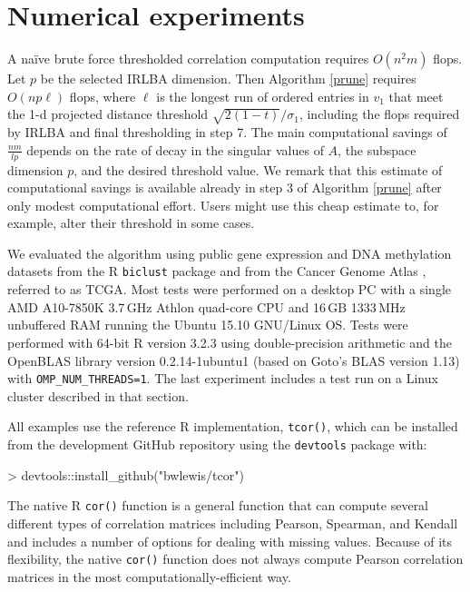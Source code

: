 \documentclass{article}
\let\proglang=\textsf
\numberwithin{algorithmctr}{section}
\begin{document}
\section{Numerical experiments}\label{examples}

A na\"ive brute force thresholded correlation computation requires $O(n^2 m)$ flops.
Let $p$ be the selected IRLBA dimension. Then Algorithm \ref{prune} requires
$O(n p \ell)$ flops, where $\ell$ is the longest run of ordered entries in
$v_1$ that meet the 1-d projected distance threshold $\sqrt{2(1-t)}/\sigma_1$,
including the flops required by IRLBA and final thresholding in step 7.  The
main computational savings of $\frac{nm}{lp}$ depends on the rate of decay in
the singular values of $A$, the subspace dimension $p$, and the desired
threshold value. We remark that this estimate of computational savings is
available already in step 3 of Algorithm \ref{prune} after only modest
computational effort. Users might use this cheap estimate to, for example,
alter their threshold in some cases.

We evaluated the algorithm using public gene expression and DNA methylation
datasets from the \proglang{R} {\tt biclust} \cite{biclust} package and from
the Cancer Genome Atlas \cite{gdac}, referred to as TCGA.  Most tests were
performed on a desktop PC with a single AMD A10-7850K 3.7$\,$GHz Athlon
quad-core CPU and 16$\,$GB 1333$\,$MHz unbuffered RAM running the Ubuntu 15.10
GNU/Linux OS. Tests were performed with 64-bit \proglang{R} version 3.2.3 using
double-precision arithmetic and the OpenBLAS library version 0.2.14-1ubuntu1
(based on Goto's BLAS version 1.13) with {\tt OMP\_NUM\_THREADS=1}. The last
experiment includes a test run on a Linux cluster described in that section.

All examples use the reference \proglang{R} implementation, {\tt tcor()}, which can be
installed from the development GitHub repository using the
{\tt devtools} package with:

\begin{Schunk}
\begin{Sinput}
> devtools::install_github("bwlewis/tcor")
\end{Sinput}
\end{Schunk}

The native \proglang{R} {\tt cor()} function is a general function that can
compute several different types of correlation matrices including Pearson,
Spearman, and Kendall and includes a number of options for dealing with missing
values.  Because of its flexibility, the native {\tt cor()} function does not
always compute Pearson correlation matrices in the most
computationally-efficient way.
\end{document}

